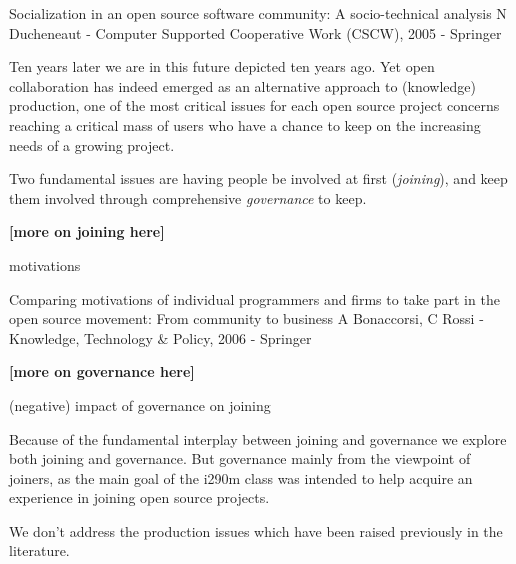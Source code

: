 Socialization in an open source software community: A socio-technical analysis
N Ducheneaut - Computer Supported Cooperative Work (CSCW), 2005 - Springer




  	

Ten years later we are in this future depicted ten years ago. Yet open collaboration has indeed emerged as an alternative approach to (knowledge) production, one of the most critical issues for each open source project concerns reaching a critical mass of users who have a chance to keep on the increasing needs of a growing project. 

Two fundamental issues are having people be involved at first ({\it joining}), and keep them involved through comprehensive {\it governance} to keep.

{\bf [more on joining here]}

motivations

Comparing motivations of individual programmers and firms to take part in the open source movement: From community to business
A Bonaccorsi, C Rossi - Knowledge, Technology \& Policy, 2006 - Springer


{\bf [more on governance here]} 

 \cite{O'Mahony2007}

(negative) impact of governance on joining \cite{halfacker2013}

Because of the fundamental interplay between joining and governance we explore both joining and governance. But governance mainly from the viewpoint of joiners, as the main goal of the i290m class was intended to help acquire an experience in joining open source projects.

We don't address the production issues which have been raised previously in the literature.


\cite{tomlinson2012}

